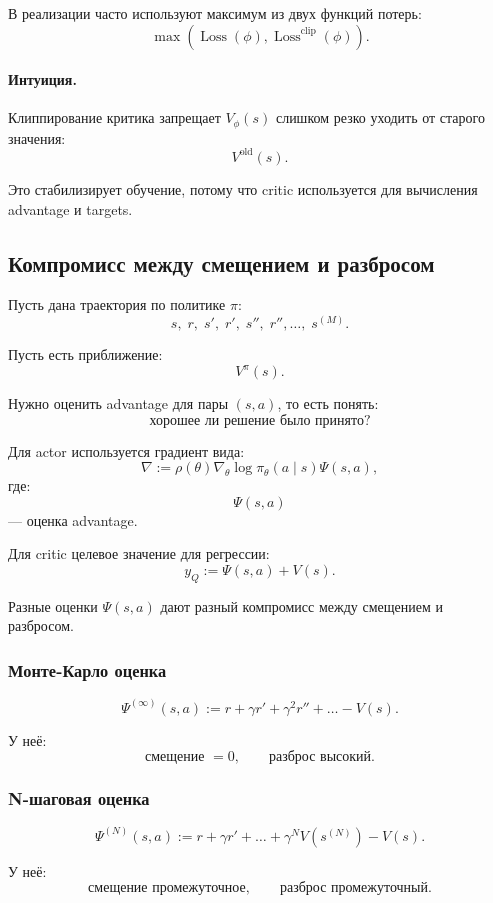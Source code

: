 \documentclass[12pt,a4paper]{article}
\begin{document}
В реализации часто используют максимум из двух функций потерь:
\[
\max
\left(
\operatorname{Loss}(\phi),
\operatorname{Loss}^{\mathrm{clip}}(\phi)
\right).
\]

\paragraph{Интуиция.}

Клиппирование критика запрещает $V_\phi(s)$ слишком резко уходить от старого значения:
\[
V^{\mathrm{old}}(s).
\]

Это стабилизирует обучение, потому что critic используется для вычисления advantage и targets.

\subsection{Компромисс между смещением и разбросом}

Пусть дана траектория по политике $\pi$:
\[
s,\;r,\;s',\;r',\;s'',\;r'',\ldots,\;s^{(M)}.
\]

Пусть есть приближение:
\[
V^\pi(s).
\]

Нужно оценить advantage для пары $(s,a)$, то есть понять:
\[
\text{хорошее ли решение было принято?}
\]

Для actor используется градиент вида:
\[
\nabla
:=
\rho(\theta)
\nabla_\theta
\log \pi_\theta(a\mid s)
\Psi(s,a),
\]
где:
\[
\Psi(s,a)
\]
--- оценка advantage.

Для critic целевое значение для регрессии:
\[
y_Q
:=
\Psi(s,a)+V(s).
\]

Разные оценки $\Psi(s,a)$ дают разный компромисс между смещением и разбросом.

\subsubsection{Монте-Карло оценка}

\[
\Psi^{(\infty)}(s,a)
:=
r+\gamma r'
+\gamma^2 r''
+\ldots
-
V(s).
\]

У неё:
\[
\text{смещение }=0,
\qquad
\text{разброс высокий}.
\]

\subsubsection{N-шаговая оценка}

\[
\Psi^{(N)}(s,a)
:=
r+\gamma r'
+\ldots
+
\gamma^N
V(s^{(N)})
-
V(s).
\]

У неё:
\[
\text{смещение промежуточное},
\qquad
\text{разброс промежуточный}.
\]
\end{document}
